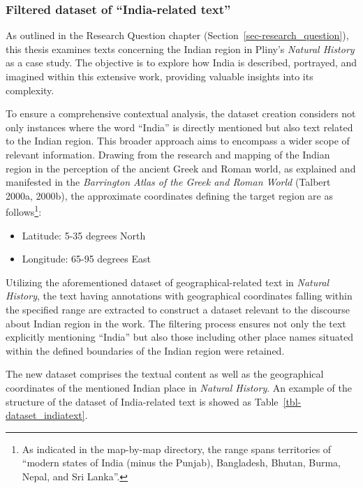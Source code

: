 \documentclass[
  12pt,
]{article}
\providecommand{\tightlist}{%
  \setlength{\itemsep}{0pt}\setlength{\parskip}{0pt}}\usepackage{longtable,booktabs,array}
\begin{document}
\hypertarget{filtered-dataset-of-india-related-text}{%
\subsubsection{Filtered dataset of ``India-related
text''}\label{filtered-dataset-of-india-related-text}}

As outlined in the Research Question chapter
(Section~\ref{sec-research_question}), this thesis examines texts
concerning the Indian region in Pliny's \emph{Natural History} as a case
study. The objective is to explore how India is described, portrayed,
and imagined within this extensive work, providing valuable insights
into its complexity.

To ensure a comprehensive contextual analysis, the dataset creation
considers not only instances where the word ``India'' is directly
mentioned but also text related to the Indian region. This broader
approach aims to encompass a wider scope of relevant information.
Drawing from the research and mapping of the Indian region in the
perception of the ancient Greek and Roman world, as explained and
manifested in the \emph{Barrington Atlas of the Greek and Roman World}
(Talbert 2000a, 2000b), the approximate coordinates defining the target
region are as follows\footnote{As indicated in the map-by-map directory,
  the range spans territories of ``modern states of India (minus the
  Punjab), Bangladesh, Bhutan, Burma, Nepal, and Sri Lanka''.}:

\begin{itemize}
\tightlist
\item
  Latitude: 5-35 degrees North
\item
  Longitude: 65-95 degrees East
\end{itemize}

Utilizing the aforementioned dataset of geographical-related text in
\emph{Natural History}, the text having annotations with geographical
coordinates falling within the specified range are extracted to
construct a dataset relevant to the discourse about Indian region in the
work. The filtering process ensures not only the text explicitly
mentioning ``India'' but also those including other place names situated
within the defined boundaries of the Indian region were retained.

The new dataset comprises the textual content as well as the
geographical coordinates of the mentioned Indian place in \emph{Natural
History}. An example of the structure of the dataset of India-related
text is showed as Table~\ref{tbl-dataset_indiatext}.
\end{document}
